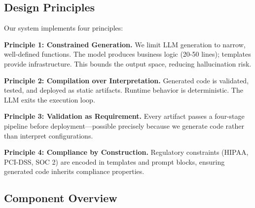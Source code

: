 \documentclass[11pt]{article}
\begin{document}
\subsection{Design Principles}

Our system implements four principles:

\textbf{Principle 1: Constrained Generation.} We limit LLM generation to narrow, well-defined functions. The model produces business logic (20-50 lines); templates provide infrastructure. This bounds the output space, reducing hallucination risk.

\textbf{Principle 2: Compilation over Interpretation.} Generated code is validated, tested, and deployed as static artifacts. Runtime behavior is deterministic. The LLM exits the execution loop.

\textbf{Principle 3: Validation as Requirement.} Every artifact passes a four-stage pipeline before deployment—possible precisely because we generate code rather than interpret configurations.

\textbf{Principle 4: Compliance by Construction.} Regulatory constraints (HIPAA, PCI-DSS, SOC 2) are encoded in templates and prompt blocks, ensuring generated code inherits compliance properties.

\subsection{Component Overview}
\end{document}

